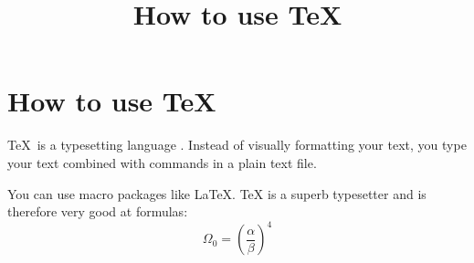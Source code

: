\documentclass[11pt,a4paper]{article}  %
\title{How to use \TeX}                %
\begin{document}
\maketitle                             %
                                   
\section{How to use \TeX}              %

\TeX\ is a typesetting language \cite{kim2002performance}. Instead of visually formatting your text, you type
your text combined with commands in a plain text file. 

You can use macro packages like \LaTeX.
TeX is a superb typesetter and is therefore very good at formulas: \[\Omega_0 = \left (\frac{\alpha}{\beta} \right ) ^ 4\]



\end{document}
